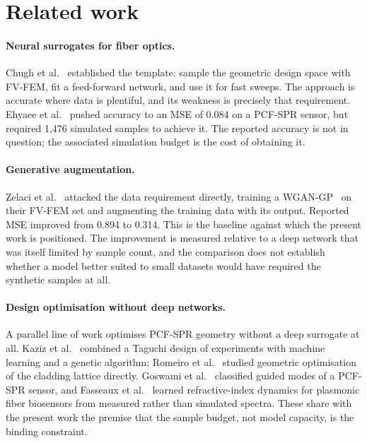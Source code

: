 \documentclass[iicol,pdflatex,sn-basic,Numbered]{sn-jnl}
\begin{document}
\section{Related work}\label{sec:related}

\paragraph{Neural surrogates for fiber optics.} Chugh et al.~\cite{chugh2019}
established the template: sample the geometric design space with FV-FEM, fit a
feed-forward network, and use it for fast sweeps. The approach is accurate where
data is plentiful, and its weakness is precisely that requirement. Ehyaee et
al.~\cite{ehyaee2024} pushed accuracy to an MSE of 0.084 on a PCF-SPR sensor, but
required 1,476 simulated samples to achieve it. The reported accuracy is not in
question; the associated simulation budget is the cost of obtaining it.

\paragraph{Generative augmentation.} Zelaci et al.~\cite{zelaci2021} attacked the
data requirement directly, training a WGAN-GP~\cite{gulrajani2017} on their FV-FEM
set and augmenting the training data with its output. Reported MSE improved from
0.894 to 0.314. This is the baseline against which the present work is
positioned. The improvement is measured relative to a deep network that was
itself limited by sample count, and the comparison does not establish whether a
model better suited to small datasets would have required the synthetic samples
at all.

\paragraph{Design optimisation without deep networks.} A parallel line of work
optimises PCF-SPR geometry without a deep surrogate at all. Kaziz et
al.~\cite{kaziz2024} combined a Taguchi design of experiments with machine
learning and a genetic algorithm; Romeiro et al.~\cite{romeiro2026} studied
geometric optimisation of the cladding lattice directly. Goswami et
al.~\cite{goswami2023} classified guided modes of a PCF-SPR sensor, and Fasseaux
et al.~\cite{fasseaux2024} learned refractive-index dynamics for plasmonic fiber
biosensors from measured rather than simulated spectra. These share with the
present work the premise that the sample budget, not model capacity, is the
binding constraint.
\end{document}
